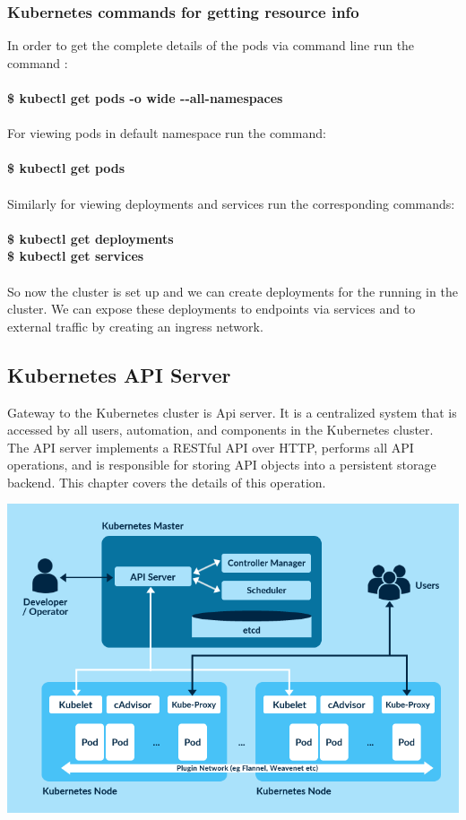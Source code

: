 \documentclass[12pt]{article}
\begin{document}
	\subsubsection{Kubernetes commands for getting resource info}
	In order to get the complete details of  the pods via command line run the command :\\\\
	\textbf{\$ kubectl get pods -o wide -{}-all-namespaces}\\\\
	For viewing pods in default namespace run the command:\\\\
	\textbf{\$ kubectl get pods}\\\\
	Similarly for viewing deployments and services run the corresponding commands:\\\\
	\textbf{\$ kubectl get deployments}\\
	\textbf{\$ kubectl get services}\\\\
	So now the cluster is set up and we can create deployments for the running in the cluster. We can expose these deployments to endpoints via services and to external traffic by creating an ingress network.
	\subsection{Kubernetes API Server}
	Gateway to the Kubernetes cluster is Api server. It is a centralized system that is accessed by all users, automation, and components in the Kubernetes cluster. The API server implements a RESTful API over HTTP, performs all API operations, and is responsible for storing API objects into a persistent storage backend. This chapter covers the details of this operation.
	\begin{center}
		\includegraphics[totalheight=0.45\textheight]{kubernetesapiserver}
	\end{center}
\end{document}
